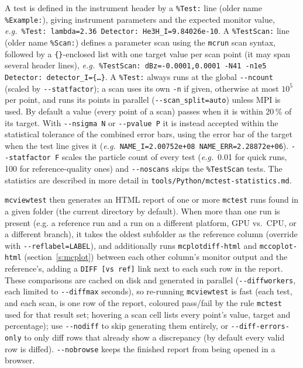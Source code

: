 A test is defined in the instrument header by a \texttt{\%Test:} line (older name
\texttt{\%Example:}), giving instrument parameters and the expected monitor value,
\textit{e.g.}\ \texttt{\%Test: lambda=2.36 Detector: He3H\_I=9.84026e-10}. A
\texttt{\%TestScan:} line (older name \texttt{\%Scan:}) defines a parameter scan
using the \verb+mcrun+ scan syntax, followed by a \texttt{\{\}}-enclosed list with one
target value per scan point (it may span several header lines), \textit{e.g.}\
\texttt{\%TestScan: dBz=-0.0001,0.0001 -N41 -n1e5 Detector: detector\_I=\{\ldots\}}.
A \texttt{\%Test:} always runs at the global \verb+--ncount+ (scaled by
\verb+--statfactor+); a scan uses its own \texttt{-n} if given, otherwise at most
$10^5$ per point, and runs its points in parallel (\verb+--scan_split=auto+) unless
MPI is used. By default a value (every point of a scan) passes when it is within
20\,\% of its target. With \verb+--nsigma N+ or \verb+--pvalue P+ it is instead
accepted within the statistical tolerance of the combined error bars, using the
error bar of the target when the test line gives it
(\textit{e.g.}\ \texttt{NAME\_I=2.00752e+08 NAME\_ERR=2.28872e+06}).
\verb+--statfactor F+ scales the particle count of every test (\textit{e.g.}\ 0.01 for
quick runs, 100 for reference-quality ones) and \verb+--noscans+ skips the
\texttt{\%TestScan} tests. The statistics are described in more detail in
\texttt{tools/Python/mctest-statistics.md}.

\verb+mcviewtest+ then generates an HTML report of one or more \verb+mctest+
runs found in a given folder (the current directory by default). When more
than one run is present (e.g. a reference run and a run on a different
platform, GPU vs.\ CPU, or a different \MCS branch), it takes the oldest
subfolder as the reference column (override with \verb+--reflabel=LABEL+), and
additionally runs \texttt{mcplotdiff-html} and \texttt{mccoplot-html}
(section~\ref{s:mcplot}) between each other column's monitor output and the
reference's, adding a \texttt{DIFF~[vs~ref]} link next to each such row in the
report. These comparisons are cached on disk and generated in parallel
(\verb+--diffworkers+, each limited to \verb+--diffmax+ seconds), so
re-running \verb+mcviewtest+ is fast (each test, and each scan, is one row of the report, coloured pass/fail by the rule \verb+mctest+ used for that result set; hovering a scan cell lists every point's value, target and percentage); use \verb+--nodiff+ to skip generating
them entirely, or \verb+--diff-errors-only+ to only diff rows that already show
a discrepancy (by default every valid row is diffed). \verb+--nobrowse+ keeps
the finished report from being opened in a browser.

